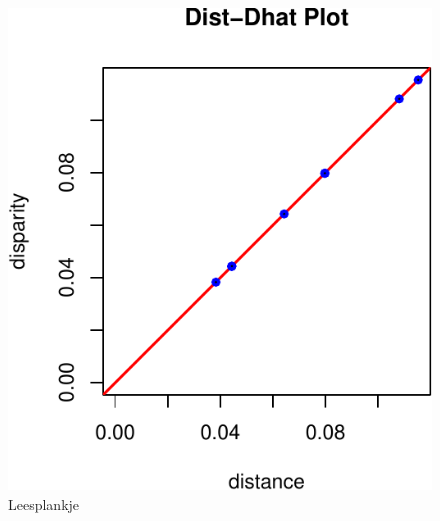 \documentclass[
  12pt,
]{article}
\begin{document}
\begin{figure}

{\centering \includegraphics{smacofPC_files/figure-latex/hoogedd-1} 

}

\caption{Leesplankje}\label{fig:hoogedd}
\end{figure}
\end{document}
